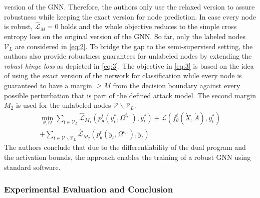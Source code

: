 \documentclass[a4paper,preprint]{sig-alternate}
\begin{document}
version of the GNN. \cite{Zuegner_2019}
Therefore, the authors only use the relaxed version to assure robustness while keeping the exact version for node prediction.
In case every node is robust, $\mathcal{\hat{L}}_M = 0$ holds and the whole objective reduces to the simple cross entropy loss
on the original version of the GNN. \cite{Zuegner_2019}
So far, only the labeled nodes $\mathcal{V}_L$ are considered in \ref{eq:2}. To bridge the gap to the semi-supervised setting,
the authors also provide robustness guarantees for unlabeled nodes by extending the \textit{robust hinge loss} as depicted in \ref{eq:3}.
The objective in \ref{eq:3} is based on the idea of using the exact version of the network for classification while every node is guaranteed to have a margin
$\geq M$ from the decision boundary against every possible perturbation that is part of the defined attack model. \cite{Zuegner_2019}
The second margin $M_2$ is used for the unlabeled nodes $\mathcal{V} \backslash \mathcal{V}_L$.
\begin{multline}
\label{eq:3}
    \min_{\theta, \Omega} \sum_{t \in \mathcal{V}_L} \mathcal{\hat{L}}_{M_1} (p_{\theta}^t (y_t^{\ast}, \Omega^{t, \cdot}), y_t^{\ast}) + \mathcal{L} (f_{\theta}^t (\dot{X}, \dot{A}), y_t^{\ast}) \\
    + \sum_{t \in \mathcal{V} \backslash \mathcal{V}_L} \mathcal{\hat{L}}_{M_2} (p_{\theta}^t (\tilde{y}_t, \Omega^{t, \cdot}), \tilde{y}_t)
\end{multline}
The authors conclude that due to the differentiability of the dual program and the activation bounds,
the approach enables the training of a robust GNN using standard software.

\subsubsection{Experimental Evaluation and Conclusion}
\end{document}
